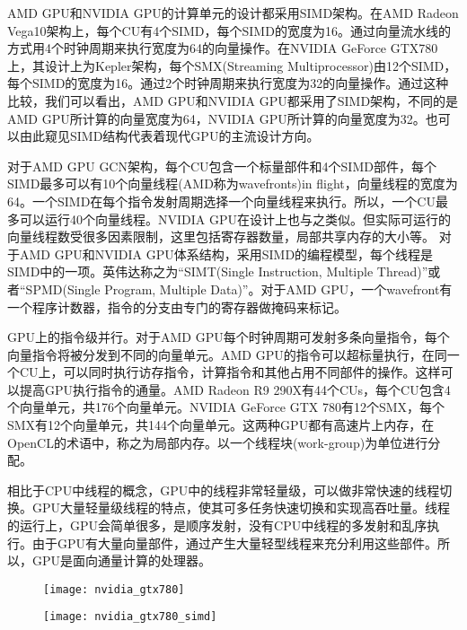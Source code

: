 AMD GPU和NVIDIA GPU的计算单元的设计都采用SIMD架构。在AMD Radeon Vega10架构上，每个CU有4个SIMD，每个SIMD的宽度为16。通过向量流水线的方式用4个时钟周期来执行宽度为64的向量操作。在NVIDIA GeForce GTX780上，其设计上为Kepler架构，每个SMX(Streaming Multiprocessor)由12个SIMD，每个SIMD的宽度为16。通过2个时钟周期来执行宽度为32的向量操作。通过这种比较，我们可以看出，AMD GPU和NVIDIA GPU都采用了SIMD架构，不同的是AMD GPU所计算的向量宽度为64，NVIDIA GPU所计算的向量宽度为32。也可以由此窥见SIMD结构代表着现代GPU的主流设计方向。

对于AMD GPU GCN架构，每个CU包含一个标量部件和4个SIMD部件，每个SIMD最多可以有10个向量线程(AMD称为wavefronts)in flight，向量线程的宽度为64。一个SIMD在每个指令发射周期选择一个向量线程来执行。所以，一个CU最多可以运行40个向量线程。NVIDIA GPU在设计上也与之类似。但实际可运行的向量线程数受很多因素限制，这里包括寄存器数量，局部共享内存的大小等。
对于AMD GPU和NVIDIA GPU体系结构，采用SIMD的编程模型，每个线程是SIMD中的一项。英伟达称之为“SIMT(Single Instruction, Multiple Thread)”或者“SPMD(Single Program, Multiple Data)”。对于AMD GPU，一个wavefront有一个程序计数器，指令的分支由专门的寄存器做掩码来标记。

GPU上的指令级并行。对于AMD GPU每个时钟周期可发射多条向量指令，每个向量指令将被分发到不同的向量单元。AMD GPU的指令可以超标量执行，在同一个CU上，可以同时执行访存指令，计算指令和其他占用不同部件的操作。这样可以提高GPU执行指令的通量。AMD Radeon R9 290X有44个CUs，每个CU包含4个向量单元，共176个向量单元。NVIDIA GeForce GTX 780有12个SMX，每个SMX有12个向量单元，共144个向量单元。这两种GPU都有高速片上内存，在OpenCL的术语中，称之为局部内存。以一个线程块(work-group)为单位进行分配。

相比于CPU中线程的概念，GPU中的线程非常轻量级，可以做非常快速的线程切换。GPU大量轻量级线程的特点，使其可多任务快速切换和实现高吞吐量。线程的运行上，GPU会简单很多，是顺序发射，没有CPU中线程的多发射和乱序执行。由于GPU有大量向量部件，通过产生大量轻型线程来充分利用这些部件。所以，GPU是面向通量计算的处理器。
\begin{figure}[htbp]
	\centering
	\texttt{[image: nvidia\_gtx780]}
	\label{fig:nvidia_gtx780}
\end{figure}

\begin{figure}[htbp]
	\centering
	\texttt{[image: nvidia\_gtx780\_simd]}
	\label{fig:nvidia_gtx780_simd}
\end{figure}

